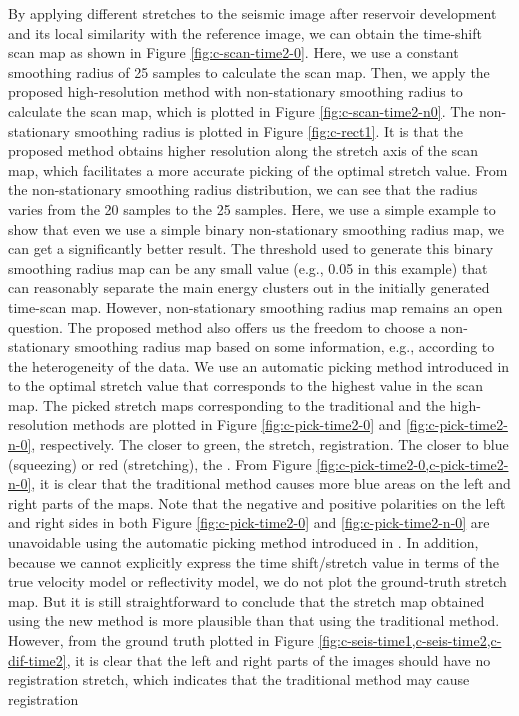 By applying different stretches to the seismic image after reservoir development and  its local similarity with the reference image, we can obtain the time-shift scan map as shown in Figure \ref{fig:c-scan-time2-0}. Here, we use a constant smoothing radius of 25 samples to calculate the scan map. Then, we apply the proposed high-resolution method with non-stationary smoothing radius to calculate the scan map, which is plotted in Figure \ref{fig:c-scan-time2-n0}. The non-stationary smoothing radius is plotted in Figure \ref{fig:c-rect1}. It is  that the proposed method obtains  higher resolution along the stretch axis of the scan map, which facilitates a more accurate picking of the optimal stretch value. From the non-stationary smoothing radius distribution, we can see that the radius varies from the  20 samples to the  25 samples. Here, we use a simple example to show that even we use a simple binary non-stationary smoothing radius map, we can get a significantly better result. The threshold used to generate this binary smoothing radius map can be any small value (e.g., 0.05 in this example) that can reasonably separate the main energy clusters out in the initially generated time-scan map. However,  non-stationary smoothing radius map remains an open question. The proposed method also offers us the freedom to choose a non-stationary smoothing radius map based on some  information, e.g., according to the heterogeneity of the data. We use an automatic picking method introduced in \cite{fomel20091} to  the optimal stretch value that corresponds to the highest value in the scan map. The picked stretch maps corresponding to the traditional and the high-resolution methods are plotted in Figure \ref{fig:c-pick-time2-0} and \ref{fig:c-pick-time2-n-0}, respectively. The closer to green, the   stretch,   registration. The closer to blue (squeezing) or red (stretching), the . From Figure \ref{fig:c-pick-time2-0,c-pick-time2-n-0}, it is clear that the traditional method causes more blue areas on the left and right parts of the maps. Note that the  negative and positive polarities on the left and right sides in both Figure \ref{fig:c-pick-time2-0} and \ref{fig:c-pick-time2-n-0} are unavoidable using the automatic picking method introduced in \cite{fomel20091}. In addition, because we cannot explicitly express the time shift/stretch value in terms of the true velocity model or reflectivity model, we do not plot the ground-truth stretch map. But it is still straightforward to conclude that the stretch map obtained using the new method is more plausible than that using the traditional method.  However, from the ground truth plotted in Figure \ref{fig:c-seis-time1,c-seis-time2,c-dif-time2}, it is clear that the left and right parts of the images should have no registration stretch, which indicates that the traditional method may cause registration 